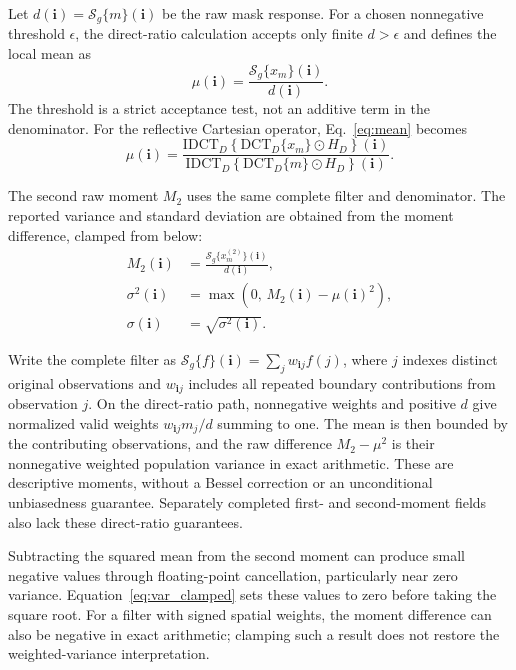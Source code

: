 \documentclass[a4paper,fleqn]{cas-sc}
\begin{document}
Let $d(\mathbf{i})=\mathcal{S}_g\{m\}(\mathbf{i})$ be the raw mask response. For a chosen nonnegative threshold $\epsilon$, the direct-ratio calculation accepts only finite $d>\epsilon$ and defines the local mean as
\begin{equation}
	\mu(\mathbf{i}) = \frac{\mathcal{S}_g\{x_m\}(\mathbf{i})}{d(\mathbf{i})}.
	\label{eq:mean}
\end{equation}
The threshold is a strict acceptance test, not an additive term in the denominator. For the reflective Cartesian operator, Eq.~\ref{eq:mean} becomes
\begin{equation}
	\mu(\mathbf{i}) = \frac{\mathrm{IDCT}_D\!\left\{\mathrm{DCT}_D\{x_m\}\odot H_D\right\}(\mathbf{i})}{\mathrm{IDCT}_D\!\left\{\mathrm{DCT}_D\{m\}\odot H_D\right\}(\mathbf{i})}.
	\label{eq:mean_explicit}
\end{equation}

The second raw moment $M_2$ uses the same complete filter and denominator. The reported variance and standard deviation are obtained from the moment difference, clamped from below:
\begin{align}
	M_2(\mathbf{i}) & = \frac{\mathcal{S}_g\{x_m^{(2)}\}(\mathbf{i})}{d(\mathbf{i})}, \label{eq:second_moment} \\
	\sigma^2(\mathbf{i}) & = \max\!\left(0,\,M_2(\mathbf{i})-\mu(\mathbf{i})^2\right), \label{eq:var_clamped} \\
	\sigma(\mathbf{i})   & = \sqrt{\sigma^2(\mathbf{i})}. \label{eq:std}
\end{align}

Write the complete filter as $\mathcal{S}_g\{f\}(\mathbf{i})=\sum_j w_{\mathbf{i}j}f(j)$, where $j$ indexes distinct original observations and $w_{\mathbf{i}j}$ includes all repeated boundary contributions from observation $j$. On the direct-ratio path, nonnegative weights and positive $d$ give normalized valid weights $w_{\mathbf{i}j}m_j/d$ summing to one. The mean is then bounded by the contributing observations, and the raw difference $M_2-\mu^2$ is their nonnegative weighted population variance in exact arithmetic. These are descriptive moments, without a Bessel correction or an unconditional unbiasedness guarantee. Separately completed first- and second-moment fields also lack these direct-ratio guarantees.

Subtracting the squared mean from the second moment can produce small negative values through floating-point cancellation, particularly near zero variance. Equation~\ref{eq:var_clamped} sets these values to zero before taking the square root. For a filter with signed spatial weights, the moment difference can also be negative in exact arithmetic; clamping such a result does not restore the weighted-variance interpretation.
\end{document}
